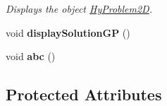 \begin{DoxyCompactItemize}
\begin{DoxyCompactList}\small\item\em Displays the object \hyperlink{classHyProblem2D}{HyProblem2D}. \item\end{DoxyCompactList}\item 
\hypertarget{classHyProblem2D_aa86797cdbb7ff793ad0ff841cb5953e9}{
void {\bfseries displaySolutionGP} ()}
\label{classHyProblem2D_aa86797cdbb7ff793ad0ff841cb5953e9}

\item 
\hypertarget{classHyProblem2D_a7018328a7519bec1ca71f441a7dfc898}{
void {\bfseries abc} ()}
\label{classHyProblem2D_a7018328a7519bec1ca71f441a7dfc898}

\end{DoxyCompactItemize}
\subsection*{Protected Attributes}

